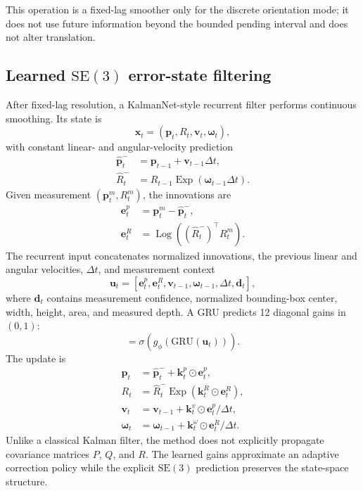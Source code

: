 \documentclass[10pt,twocolumn]{article}
\newcommand{\SE}{\mathrm{SE}(3)}
\newcommand{\Exp}{\operatorname{Exp}}
\newcommand{\Log}{\operatorname{Log}}
\begin{document}
This operation is a fixed-lag smoother only for the discrete orientation mode;
it does not use future information beyond the bounded pending interval and
does not alter translation.

\subsection{Learned $\SE$ error-state filtering}

After fixed-lag resolution, a KalmanNet-style recurrent filter
\cite{revach2022kalmannet} performs continuous smoothing. Its state is
\begin{equation}
\bm{x}_t=(\bm{p}_t,R_t,\bm{v}_t,\bm{\omega}_t),
\end{equation}
with constant linear- and angular-velocity prediction
\begin{align}
\widehat{\bm{p}}_t^- &= \bm{p}_{t-1}+\bm{v}_{t-1}\Delta t,\\
\widehat{R}_t^- &= R_{t-1}\Exp(\bm{\omega}_{t-1}\Delta t).
\end{align}
Given measurement $(\bm{p}_t^m,R_t^m)$, the innovations are
\begin{align}
\bm{e}_t^p &= \bm{p}_t^m-\widehat{\bm{p}}_t^-,\\
\bm{e}_t^R &= \Log\left((\widehat{R}_t^-)^{\top}R_t^m\right).
\end{align}
The recurrent input concatenates normalized innovations, the previous linear
and angular velocities, $\Delta t$, and measurement context
\begin{equation}
\bm{u}_t=[\bm{e}_t^p,\bm{e}_t^R,\bm{v}_{t-1},\bm{\omega}_{t-1},
\Delta t,\bm{d}_t],
\end{equation}
where $\bm{d}_t$ contains measurement confidence, normalized bounding-box
center, width, height, area, and measured depth. A GRU predicts 12 diagonal
gains in $(0,1)$:
\begin{equation}
[\bm{k}_t^p,\bm{k}_t^R,\bm{k}_t^v,\bm{k}_t^{\omega}]
=\sigma(g_{\phi}(\mathrm{GRU}(\bm{u}_t))).
\end{equation}
The update is
\begin{align}
\bm{p}_t &= \widehat{\bm{p}}_t^-+\bm{k}_t^p\odot\bm{e}_t^p,\\
R_t &= \widehat{R}_t^-\Exp(\bm{k}_t^R\odot\bm{e}_t^R),\\
\bm{v}_t &= \bm{v}_{t-1}+\bm{k}_t^v\odot\bm{e}_t^p/\Delta t,\\
\bm{\omega}_t &= \bm{\omega}_{t-1}
 +\bm{k}_t^{\omega}\odot\bm{e}_t^R/\Delta t.
\end{align}
Unlike a classical Kalman filter, the method does not explicitly propagate
covariance matrices $P$, $Q$, and $R$. The learned gains approximate an
adaptive correction policy while the explicit $\SE$ prediction preserves the
state-space structure.
\end{document}
